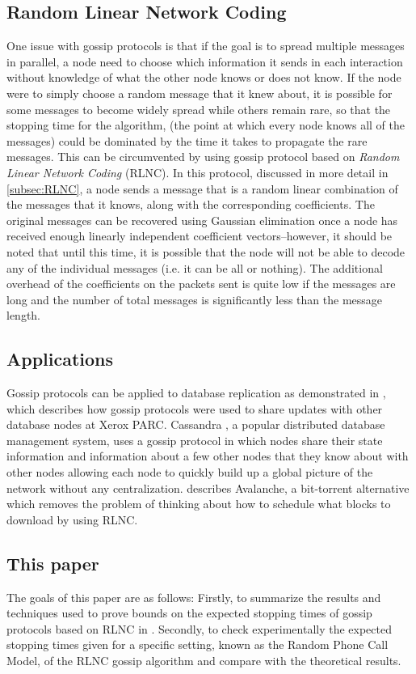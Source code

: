 \documentclass{article} %
\begin{document}
\subsection{Random Linear Network Coding}
One issue with gossip protocols is that if the goal is to spread multiple messages in parallel, a node need to choose which information it sends in each interaction without knowledge of what the other node knows or does not know. If the node were to simply choose a random message that it knew about, it is possible for some messages to become widely spread while others remain rare, so that the stopping time for the algorithm, (the point at which every node knows all of the messages) could be dominated by the time it takes to propagate the rare messages. This can be circumvented by using gossip protocol based on \emph{Random Linear Network Coding} (RLNC). In this protocol, discussed in more detail in \ref{subsec:RLNC}, a node sends a message that is a random linear combination of the messages that it knows, along with the corresponding coefficients. The original messages can be recovered using Gaussian elimination once a node has received enough linearly independent coefficient vectors--however, it should be noted that until this time, it is possible that the node will not be able to decode any of the individual messages (i.e. it can be all or nothing). The additional overhead of the coefficients on the packets sent is quite low if the messages are long and the number of total messages is significantly less than the message length.

\subsection{Applications}
Gossip protocols can be applied to database replication as demonstrated in \cite{demers1987epidemic}, which describes how gossip protocols were used to share updates with other database nodes at Xerox PARC. Cassandra  \cite{lakshman2010cassandra}, a popular distributed database management system, uses a gossip protocol in which nodes share their state information and information about a few other nodes that they know about with other nodes allowing each node to quickly build up a global picture of the network without any centralization. \cite{export:67453} describes Avalanche, a bit-torrent alternative which removes the problem of thinking about how to schedule what blocks to download by using RLNC.

\subsection{This paper}
The goals of this paper are as follows: Firstly, to summarize the results and techniques used to prove bounds on the expected stopping times of gossip protocols based on RLNC in \cite{haeupler2011analyzing}. Secondly, to check experimentally the expected stopping times given for a specific setting, known as the Random Phone Call Model, of the RLNC gossip algorithm and compare with the theoretical results. 
\end{document}
